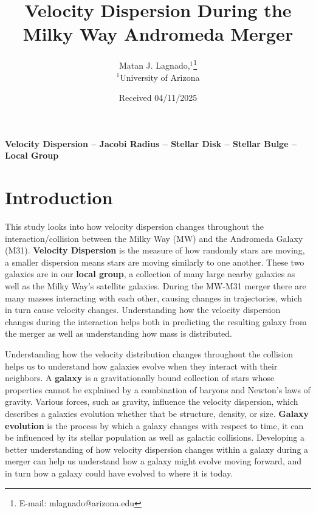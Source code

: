 \documentclass[fleqn,usenatbib]{mnras}
\title[Velocity Dispersion During the Milky Way Andromeda Merger]{Velocity Dispersion During the Milky Way Andromeda Merger}
\author[M. J. Lagnado et al.]{
Matan J. Lagnado,$^{1}$\thanks{E-mail: mlagnado@arizona.edu}
\\
$^{1}$University of Arizona\\
}
\date{Received 04/11/2025}
\begin{document}
\label{firstpage}
\pagerange{\pageref{firstpage}--\pageref{lastpage}}
\maketitle


\begin{keywords}
\textbf{Velocity Dispersion -- Jacobi Radius -- Stellar Disk -- Stellar Bulge -- Local Group}
\end{keywords}



\section{Introduction}

This study looks into how velocity dispersion changes throughout the interaction/collision between the Milky Way (MW) and the Andromeda Galaxy (M31). \textbf{Velocity Dispersion} is the measure of how randomly stars are moving, a smaller dispersion means stars are moving similarly to one another. These two galaxies are in our \textbf{local group}, a collection of many large nearby galaxies as well as the Milky Way's satellite galaxies. During the MW-M31 merger there are many masses interacting with each other, causing changes in trajectories, which in turn cause velocity changes. Understanding how the velocity dispersion changes during the interaction helps both in predicting the resulting galaxy from the merger as well as understanding how mass is distributed.

Understanding how the velocity distribution changes throughout the collision helps us to understand how galaxies evolve when they interact with their neighbors. A \textbf{galaxy} is a gravitationally bound collection of stars whose properties cannot be explained by a combination of baryons and Newton's laws of gravity.\cite{Willman_2012} Various forces, such as gravity, influence the velocity dispersion, which describes a galaxies evolution whether that be structure, density, or size. \textbf{Galaxy evolution} is the process by which a galaxy changes with respect to time, it can be influenced by its stellar population as well as galactic collisions. Developing a better understanding of how velocity dispersion changes within a galaxy during a merger can help us understand how a galaxy might evolve moving forward, and in turn how a galaxy could have evolved to where it is today.
\end{document}
